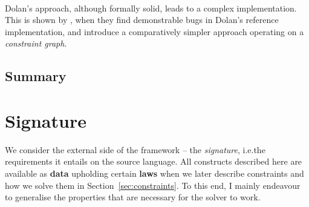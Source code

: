 \paragraph{\simplesub{}} 
Dolan's approach, although formally solid, leads to a complex implementation. This is shown by \textcite{simple-sub}, when they find demonstrable bugs in Dolan's reference implementation, and introduce a comparatively simpler approach operating on a \emph{constraint graph}. 

\paragraph{\mlstruct{}}
\color{black}

\subsection{Summary}


\section{Signature}
\label{sec:signature}

We consider the external side of the \inference{} framework -- the \emph{signature}, i.e.\@ the requirements it entails on the source language. 
All constructs described here are available as \textbf{data} upholding certain \textbf{laws} when we later describe constraints and how we solve them in Section~\ref{sec:constraints}. To this end, I mainly endeavour to generalise the properties that are necessary for the \mlstruct{} solver to work.

